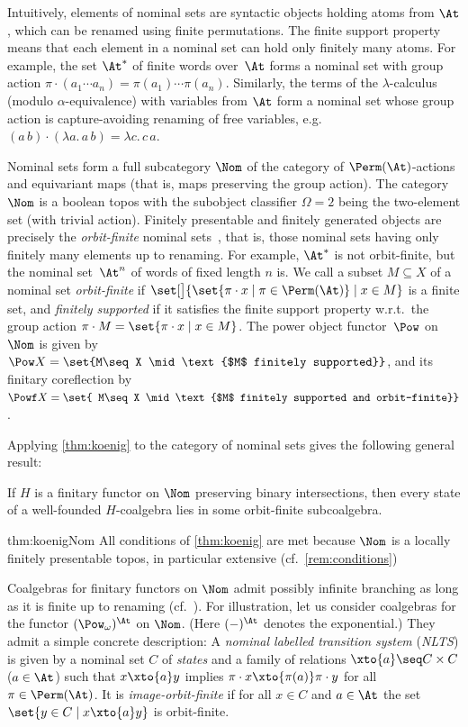 Intuitively, elements of nominal sets are syntactic objects holding atoms from $\At$,
which can be renamed using finite permutations. The
finite support property means that each element in a nominal set can
hold only finitely many atoms. For example, the set $\At^*$ of finite words over~$\At$ forms a nominal set with group action $\pi\cdot (a_1\cdots a_n) = \pi(a_1)\cdots \pi(a_n)$. Similarly, the terms of the $\lambda$-calculus (modulo $\alpha$-equivalence) with variables from $\At$ form a nominal set whose group action is capture-avoiding renaming of free variables, e.g.\ $(a\, b)\cdot (\lambda a.\,a\, b) = \lambda c.\, c\, a$.



 Nominal sets form a full subcategory $\Nom$ of the category of $\Perm(\At)$-actions and equivariant maps (that is, maps preserving
the group action).
The category $\Nom$ is a \lfp boolean topos with the subobject
classifier $\Omega = 2$ being the two-element set (with trivial action).
Finitely presentable and finitely generated objects are precisely the
\emph{orbit-finite} nominal sets~\cite[Thm.~5.16]{pitts13}, that is, those nominal sets having
only finitely many elements up to renaming. For example, $\At^*$ is not orbit-finite, but the nominal set~$\At^n$ of words of fixed length $n$ is. We call a subset $M\subseteq X$ of a nominal set \emph{orbit-finite}
if $\set[\big]{\set{\pi\cdot x\mid \pi \in \Perm(\At)}\mid x\in M}$ is a finite set, and \emph{finitely supported} if it satisfies the finite support property w.r.t.\ the group action $\pi\cdot M = \set{\pi\cdot x\mid x\in M}$. The power object functor~$\Pow$ on $\Nom$ is given by $\Pow X = \set{M\seq X \mid \text{$M$ finitely supported}}$, and its finitary coreflection by $\Powf X =\set{ M\seq X \mid \text{$M$ finitely supported and orbit-finite}}$. 

Applying \autoref{thm:koenig} to the category of nominal sets gives the following general result:
\begin{theorem}\label{thm:koenigNom}
  If $H$ is a finitary functor on $\Nom$ preserving binary intersections, then every state of a well-founded $H$-coalgebra lies in some orbit-finite
  subcoalgebra.
\end{theorem}
\begin{proofappendix}{thm:koenigNom}
  All conditions of \autoref{thm:koenig} are met because $\Nom$ is a locally finitely presentable topos, in particular extensive (cf.\ \autoref{rem:conditions})
\end{proofappendix}
Coalgebras for finitary functors on $\Nom$ admit possibly
infinite branching as long as it is finite up to renaming (cf.\ \cite[Sec.\ 6.2]{msw16}). For illustration, let us consider coalgebras for the functor $(\Pow_\omega)^\At$ on $\Nom$. (Here $(-)^\At$ denotes the exponential.) They admit a simple concrete description: A \emph{nominal labelled transition system} (\emph{NLTS}) is given by a nominal set $C$ of \emph{states} and a family of relations $\mathord{\xto{a}} \seq C\times C$  ($a\in \At$) such that $x\xto{a} y$ implies $\pi\cdot x \xto{\pi(a)} \pi\cdot y$ for all $\pi \in \Perm(\At)$. It is \emph{image-orbit-finite} if for all $x\in C$ and $a\in \At$ the set $\set{y\in C\mid x\xto{a} y}$ is orbit-finite.

